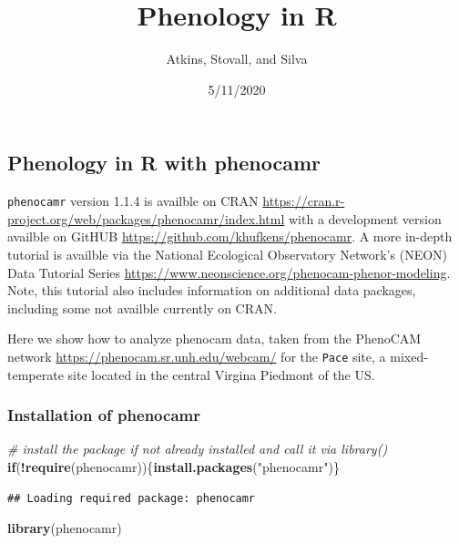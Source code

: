 \documentclass[
]{article}
\title{Phenology in R}
\author{Atkins, Stovall, and Silva}
\date{5/11/2020}
\newenvironment{Shaded}{\begin{snugshade}}{\end{snugshade}}
\newcommand{\CommentTok}[1]{\textcolor[rgb]{0.56,0.35,0.01}{\textit{#1}}}
\newcommand{\ControlFlowTok}[1]{\textcolor[rgb]{0.13,0.29,0.53}{\textbf{#1}}}
\newcommand{\KeywordTok}[1]{\textcolor[rgb]{0.13,0.29,0.53}{\textbf{#1}}}
\newcommand{\NormalTok}[1]{#1}
\newcommand{\OperatorTok}[1]{\textcolor[rgb]{0.81,0.36,0.00}{\textbf{#1}}}
\newcommand{\StringTok}[1]{\textcolor[rgb]{0.31,0.60,0.02}{#1}}
\begin{document}
\maketitle

\hypertarget{phenology-in-r-with-phenocamr}{%
\subsection{Phenology in R with
phenocamr}\label{phenology-in-r-with-phenocamr}}

\texttt{phenocamr} version 1.1.4 is availble on CRAN
\url{https://cran.r-project.org/web/packages/phenocamr/index.html} with
a development version availble on GitHUB
\url{https://github.com/khufkens/phenocamr}. A more in-depth tutorial is
availble via the National Ecological Observatory Network's (NEON) Data
Tutorial Series
\url{https://www.neonscience.org/phenocam-phenor-modeling}. Note, this
tutorial also includes information on additional data packages,
including some not availble currently on CRAN.

Here we show how to analyze phenocam data, taken from the PhenoCAM
network \url{https://phenocam.sr.unh.edu/webcam/} for the \texttt{Pace}
site, a mixed-temperate site located in the central Virgina Piedmont of
the US.

\hypertarget{installation-of-phenocamr}{%
\subsubsection{Installation of
phenocamr}\label{installation-of-phenocamr}}

\begin{Shaded}
\begin{Highlighting}[]
\CommentTok{\# install the package if not already installed and call it via library()}
\ControlFlowTok{if}\NormalTok{(}\OperatorTok{!}\KeywordTok{require}\NormalTok{(phenocamr))\{}\KeywordTok{install.packages}\NormalTok{(}\StringTok{"phenocamr"}\NormalTok{)\}}
\end{Highlighting}
\end{Shaded}

\begin{verbatim}
## Loading required package: phenocamr
\end{verbatim}

\begin{Shaded}
\begin{Highlighting}[]
\KeywordTok{library}\NormalTok{(phenocamr)}
\end{Highlighting}
\end{Shaded}
\end{document}
